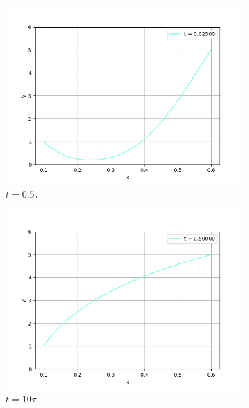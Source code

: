 \documentclass[12pt]{article}%
\begin{document}
\begin{figure}[H]
\centering
\begin{subfigure}{0.32\textwidth}
    \includegraphics[width=\textwidth]{implicit-phi3-time-0.02500.png}
    \caption{$t = 0.5 \tau$}
\end{subfigure}
\hfill
\begin{subfigure}{0.32\textwidth}
    \includegraphics[width=\textwidth]{implicit-phi3-time-0.50000.png}
    \caption{$t = 10 \tau$}
\end{subfigure}
\hfill
\begin{subfigure}{0.32\textwidth}

\end{subfigure}
\end{figure}
\end{document}
